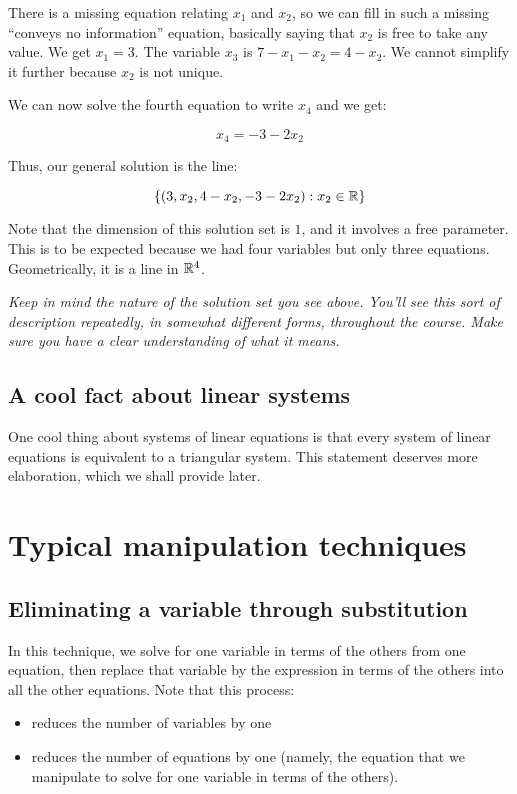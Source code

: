 \documentclass[10pt]{amsart}
\begin{document}
There is a missing equation relating $x_1$ and $x_2$, so we can fill
in such a missing ``conveys no information'' equation, basically
saying that $x_2$ is free to take any value. We get $x_1 = 3$. The
variable $x_3$ is $7 - x_1 - x_2 = 4 - x_2$. We cannot simplify it
further because $x_2$ is not unique.

We can now solve the fourth equation to write $x_4$ and we get:

$$x_4 = -3 - 2x_2$$

Thus, our general solution is the line:

$$\{ (3,x_2,4-x_2,-3-2x_2): x_2 \in \mathbb{R} \}$$

Note that the dimension of this solution set is $1$, and it involves a
free parameter. This is to be expected because we had four variables
but only three equations. Geometrically, it is a line in $\mathbb{R}^4$.

{\em Keep in mind the nature of the solution set you see above. You'll
  see this sort of description repeatedly, in somewhat different
  forms, throughout the course. Make sure you have a clear
  understanding of what it means.}
\subsection{A cool fact about linear systems}

One cool thing about systems of linear equations is that every system
of linear equations is equivalent to a triangular system. This
statement deserves more elaboration, which we shall provide later.

\section{Typical manipulation techniques}

\subsection{Eliminating a variable through substitution}

In this technique, we solve for one variable in terms of the others
from one equation, then replace that variable by the expression in
terms of the others into all the other equations. Note that this
process:

\begin{itemize}
\item reduces the number of variables by one
\item reduces the number of equations by one (namely, the equation
  that we manipulate to solve for one variable in terms of the others).
\end{itemize}
\end{document}
